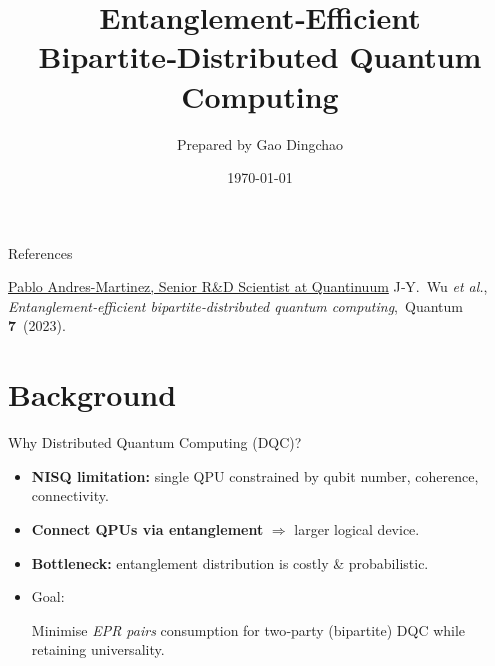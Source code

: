 \documentclass{beamer}
\title[Entanglement‑Efficient DQC]{Entanglement‑Efficient Bipartite‑Distributed Quantum Computing}
\author{Prepared by Gao Dingchao}
\institute{Reading Seminar}
\date{\today}
\begin{document}
	
	\begin{frame}[plain]
		\titlepage
	\end{frame}
	
	\begin{frame}{References}
		\footnotesize
		\begin{thebibliography}{9}
			 \href{https://pabloandrescq.github.io/}{Pablo Andres-Martinez, Senior R\&D Scientist at Quantinuum}
			J‑Y. Wu \textit{et al.}, \emph{Entanglement‑efficient bipartite‑distributed quantum computing},\ Quantum \textbf{7} (2023).
		\end{thebibliography}
	\end{frame}
	
%	
	\section{Background}
	
	\begin{frame}{Why Distributed Quantum Computing (DQC)?}
		\begin{itemize}
			\item \textbf{NISQ limitation:} single QPU constrained by qubit number, coherence, connectivity.
			\item \textbf{Connect QPUs via entanglement} \(\Rightarrow\) larger logical device.
			\item \textbf{Bottleneck:} entanglement distribution is costly \& probabilistic.
			\item Goal: \\[-.3em]
			\begin{block}{}
				Minimise \emph{EPR pairs} consumption for two‑party (bipartite) DQC while retaining universality.
			\end{block}
		\end{itemize}
	\end{frame}
	
\end{document}
